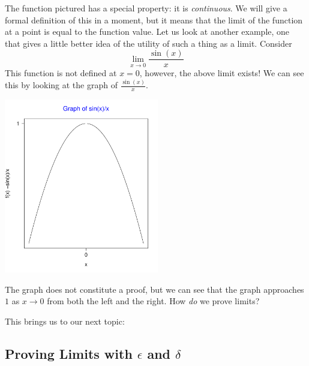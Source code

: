 \documentclass[12pt,a4paper]{article} %
\begin{document}
The function pictured has a special property: it is \emph{continuous}.  We will give a formal definition of this in a moment, but it means that the limit of the function at a point is equal to the function value.  Let us look at another example, one that gives a little better idea of the utility of such a thing as a limit.  Consider\\

\begin{equation}
\lim_{x\rightarrow 0}\frac{\sin(x)}{x}
\end{equation}
This function is not defined at $x=0$, however, the above limit exists!  We can see this by looking at the graph of $\frac{\sin(x)}{x}$.  

\includegraphics[height=3in]{sinxoverx.pdf}

The graph does not constitute a proof, but we can see that the graph approaches $1$ as $x\rightarrow 0$ from both the left and the right.    How \emph{do} we prove limits?


This brings us to our next topic:

\subsection{Proving Limits with $\epsilon$ and $\delta$}
\end{document}

